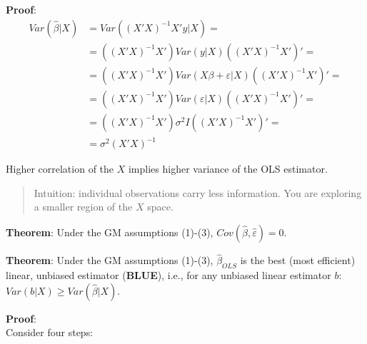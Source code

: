 \documentclass[12pt,]{book}
\begin{document}
\textbf{Proof}:
\[
\begin{aligned}
    Var(\hat \beta |X) &= Var( (X'X)^{-1} X'y|X) = \\
    &= ((X'X)^{-1} X' ) Var(y|X) ((X'X)^{-1} X' )' = \\
    &= ((X'X)^{-1} X' ) Var(X\beta + \varepsilon|X) ((X'X)^{-1} X' )' = \\
    &= ((X'X)^{-1} X' ) Var(\varepsilon|X) ((X'X)^{-1} X' )' = \\
    &= ((X'X)^{-1} X' ) \sigma^2 I ((X'X)^{-1} X' )' =  \\
    &= \sigma^2 (X'X)^{-1}
\end{aligned}
\]
\[\tag*{$\blacksquare$}\]

Higher correlation of the \(X\) implies higher variance of the OLS estimator.

\begin{quote}
Intuition: individual observations carry less information. You are exploring a smaller region of the \(X\) space.
\end{quote}

\textbf{Theorem}:
Under the GM assumptions (1)-(3), \(Cov (\hat \beta, \hat \varepsilon ) = 0\).

\textbf{Theorem}:
Under the GM assumptions (1)-(3), \(\hat \beta _ {OLS}\) is the best (most efficient) linear, unbiased estimator (\textbf{BLUE}), i.e., for any unbiased linear estimator \(b\): \(Var (b|X) \geq Var (\hat \beta |X)\).

\textbf{Proof}:\\
Consider four steps:
\end{document}
